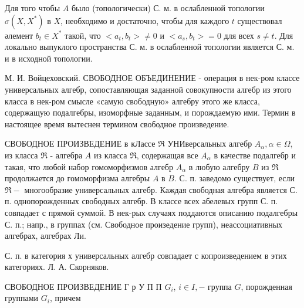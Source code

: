 \documentclass[10pt]{article}
\begin{document}
Для того чтобы $A$ было (топологически) С. м. в ослабленной топологии $\sigma\left(X, X^{*}\right)$ в $X$, необходимо и достаточно, чтобы для каждого $t$ существовал әлемент $b_{t} \in X^{*}$ такой, что $<a_{t}, b_{t}>\neq 0$ и $<a_{s}, b_{t}>=0$ для всех $s \neq t$. Для локально выпуклого пространства С. м. в ослабленной топологии является С. м. и в исходной топологии.



М. И. Войцеховский. СВОБОДНОЕ ОБЪЕДИНЕНИЕ - операция в нек-ром классе универсальных алгебр, сопоставляющая заданной совокупности алгебр из этого класса в нек-ром смысле «самую свободную» алгебру этого же класса, содержащую подалгебры, изоморфные заданным, и порождаемую ими. Термин в настоящее время вытеснен термином свободное произведение.



СВОБОДНОЕ ПРОИЗВЕДЕНИЕ в кЛассе $\Re$ УНИверсальных алгебр $A_{\alpha}, \alpha \in \Omega$, из класса $\Re$ - алгебра $A$ из класса $\mathfrak{R}$, содержащая все $A_{\alpha}$ в качестве подалгебр и такая, что любой набор гомоморфизмов алгебр $A_{\alpha}$ в любую алгебру $B$ из $\Re$ продолжается до гомоморфизма алгебры $A$ в $B$. С. п. заведомо существует, если $\Re-$ многообразие универсальных алгебр. Каждая свободная алгебра является С. п. однопорожденных свободных алгебр. В классе всех абелевых групп С. п. совпадает с прямой суммой. В нек-рых случаях поддаются описанию подалгебры С. п.; напр., в группах (см. Свободное произедение групп), неассоциативных алгебрах, алгебрах Ли.



С. п. в категория х универсальных алгебр совпадает с копроизведением в этих категориях. Л. А. Скорняков.



СВОБОДНОЕ ПРОИЗВЕДЕНИЕ Г р У П П $G_{i}$, $i \in I,-$ группа $G$, порожденная группами $G_{i}$, причем
\end{document}
